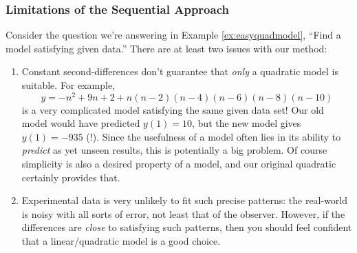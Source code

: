 


\subsubsection*{Limitations of the Sequential Approach}

Consider the question we're answering in Example \ref{ex:easyquadmodel}, ``Find a model satisfying given data.'' There are at least two issues with our method:
\begin{enumerate}
  \item Constant second-differences don't guarantee that \emph{only} a quadratic model is suitable. For example,
  \[
  	y=-n^2+9n+2 +n(n-2)(n-4)(n-6)(n-8)(n-10)
  \]
  is a very complicated model satisfying the same given data set! Our old model would have predicted $y(1)=10$, but the new model gives $y(1)=-935$ (!). Since the usefulness of a model often lies in its ability to \emph{predict} as yet unseen results, this is potentially a big problem. Of course simplicity is also a desired property of a model, and our original quadratic certainly provides that.

  \item Experimental data is very unlikely to fit such precise patterns: the real-world is noisy with all sorts of error, not least that of the observer. However, if the differences are \emph{close} to satisfying such patterns, then you should feel confident that a linear/quadratic model is a good choice.
\end{enumerate}



